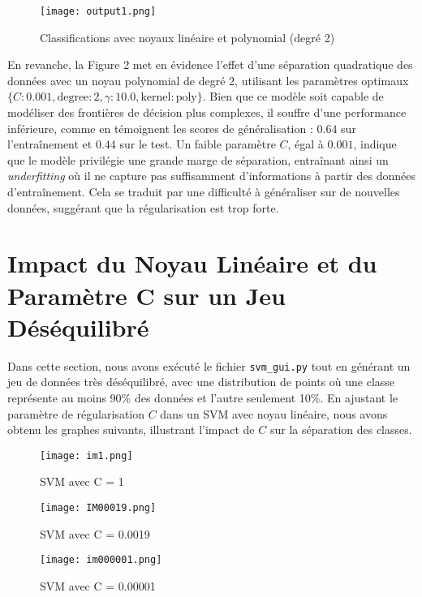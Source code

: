 \documentclass[12pt,a4paper]{report}
\begin{document}
   
\begin{figure}[H]
    \centering
    \begin{minipage}{0.9\textwidth}
        \centering
        \texttt{[image: output1.png]}
        \caption{ Classifications avec noyaux linéaire et polynomial (degré 2) }
    \end{minipage}
    \end{figure}  

En revanche, la Figure 2 met en évidence l'effet d'une séparation quadratique des données avec un noyau polynomial de degré 2, utilisant les paramètres optimaux $\{C: 0.001, \text{degree}: 2, \gamma: 10.0, \text{kernel}: \text{poly}\}$. Bien que ce modèle soit capable de modéliser des frontières de décision plus complexes, il souffre d'une performance inférieure, comme en témoignent les scores de généralisation : $0.64$ sur l'entraînement et $0.44$ sur le test. Un faible paramètre $C$, égal à $0.001$, indique que le modèle privilégie une grande marge de séparation, entraînant ainsi un \textit{underfitting} où il ne capture pas suffisamment d'informations à partir des données d'entraînement. Cela se traduit par une difficulté à généraliser sur de nouvelles données, suggérant que la régularisation est trop forte.

\section{Impact du Noyau Linéaire et du Paramètre C sur un Jeu Déséquilibré}

Dans cette section, nous avons exécuté le fichier \texttt{svm\_gui.py} tout en générant un jeu de données très déséquilibré, avec une distribution de points où une classe représente au moins 90\% des données et l'autre seulement 10\%. En ajustant le paramètre de régularisation \( C \) dans un SVM avec noyau linéaire, nous avons obtenu les graphes suivants, illustrant l'impact de \( C \) sur la séparation des classes.


\begin{figure}[H]
    \centering
    \begin{minipage}{0.5\textwidth}
        \centering
        \texttt{[image: im1.png]}
        \caption{SVM avec C = 1}
    \end{minipage}\hfill
    \begin{minipage}{0.5\textwidth}
        \centering
        \texttt{[image: IM00019.png]}
        \caption{SVM avec C = 0.0019}
    \end{minipage}
    \begin{minipage}{0.5\textwidth}
        \centering
        \texttt{[image: im000001.png]}
        \caption{SVM avec C = 0.00001 }
    \end{minipage}
\end{figure}
\end{document}

